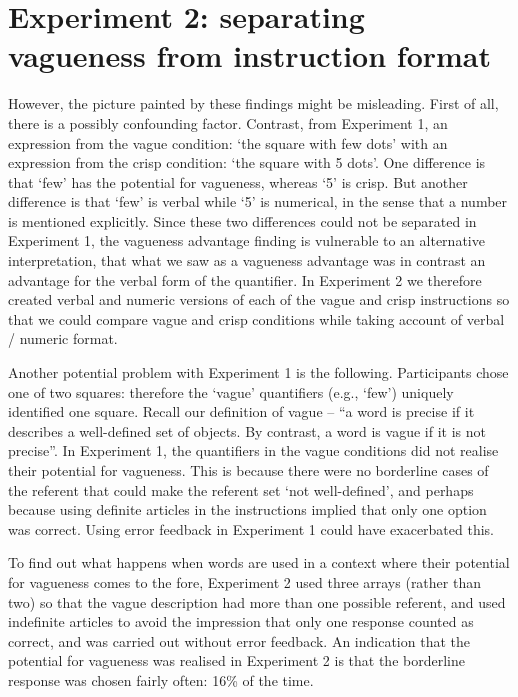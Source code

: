 \documentclass[%
man,		%
floatsintext,%
apacite%
]{apa6} %
\begin{document}
\section{Experiment 2: separating vagueness from instruction format}

However, the picture painted by these findings might be misleading. First of all, there is a possibly confounding factor. Contrast, from Experiment 1, an expression from the vague condition: `the square with few dots' with an expression from the crisp condition: `the square with 5 dots'. One difference is that `few' has the potential for vagueness, whereas `5' is crisp. But another difference is that `few' is verbal while `5' is numerical, in the sense that a number is mentioned explicitly. Since these two differences could not be separated in Experiment 1, the vagueness advantage finding is vulnerable to an alternative interpretation, that what we saw as a vagueness advantage was in contrast an advantage for the verbal form of the quantifier. In Experiment 2 we therefore created verbal and numeric versions of each of the vague and crisp instructions so that we could compare vague and crisp conditions while taking account of verbal / numeric format.

Another potential problem with Experiment 1 is the following. Participants chose one of two squares: therefore the `vague' quantifiers (e.g., `few') uniquely identified one square. Recall our definition of vague  -- ``a word is precise if it describes a well-defined set of objects. By contrast, a word is vague if it is not precise''.  In Experiment 1, the quantifiers in the vague conditions did not realise their potential for vagueness. This is because there were no borderline cases of the referent that could make the referent set `not well-defined', and perhaps because using definite articles in the instructions implied that only one option was correct. Using error feedback in Experiment 1 could have exacerbated this.

To find out what happens when words are used in a context where their potential for vagueness comes to the fore, Experiment 2 used three arrays (rather than two) so that the vague description had more than one possible referent, and used indefinite articles to avoid the impression that only one response counted as correct, and was carried out without error feedback.
An indication that the potential for vagueness was realised in Experiment 2 is that the borderline response was chosen fairly often: 16\% of the time.
\end{document}
